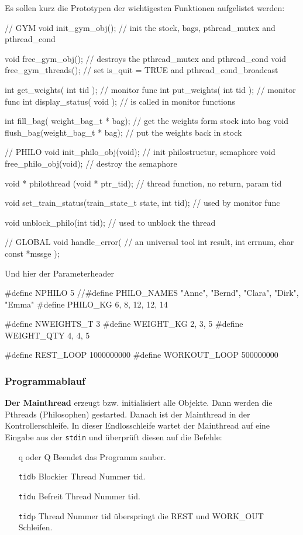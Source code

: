 \documentclass[
   draft=false
  ,paper=a4
  ,twoside=false
  ,fontsize=11pt
  ,headsepline
  ,BCOR10mm
  ,DIV11
  ,parskip=full+
]{scrartcl} %
\begin{document}
Es sollen kurz die Prototypen der wichtigesten Funktionen aufgelistet werden:
\begin{ccode}
//     GYM
void init_gym_obj();  // init the stock, bags, pthread_mutex and pthread_cond

void free_gym_obj();  // destroys the pthread_mutex and pthread_cond
void free_gym_threads(); //  set is_quit = TRUE and pthread_cond_broadcast

int get_weights( int tid );  // monitor func
int put_weights( int tid );  // monitor func
int display_status( void );  // is called in monitor functions

int fill_bag( weight_bag_t * bag);  // get the weights form stock into bag
void flush_bag(weight_bag_t * bag); // put the weights back in stock

//     PHILO
void init_philo_obj(void);  // init philostructur, semaphore
void free_philo_obj(void);  // destroy the semaphore

void * philothread (void * ptr_tid); // thread function, no return, param tid

void set_train_status(train_state_t state, int tid); // used by monitor func

void unblock_philo(int tid);  // used to unblock the thread

//     GLOBAL
void handle_error(            // an universal tool
int result, int errnum, char const *mssge
);

\end{ccode}


Und hier der Parameterheader
\begin{ccode}
  #define NPHILO      5
  //#define PHILO_NAMES { "Anne", "Bernd", "Clara", "Dirk", "Emma" }
  #define PHILO_KG    {      6,       8,      12,     12,     14 }

  #define NWEIGHTS_T 3
  #define WEIGHT_KG  { 2, 3, 5 }
  #define WEIGHT_QTY { 4, 4, 5 }

  #define REST_LOOP   1000000000
  #define WORKOUT_LOOP 500000000
\end{ccode}


\subsubsection{Programmablauf}
\textbf{Der Mainthread} erzeugt bzw. initialisiert alle Objekte. Dann werden
die Pthreads (Philosophen) gestarted. Danach ist der Mainthread in der
Kontrollerschleife. In dieser Endlosschleife wartet der
Mainthread auf eine Eingabe aus der \texttt{stdin} und überprüft diesen
auf die Befehle:
\begin{enumerate}
  \item[q oder Q] Beendet das Programm sauber.
  \item[\texttt{tid}b] Blockier Thread Nummer tid.
  \item[\texttt{tid}u] Befreit Thread Nummer tid.
  \item[\texttt{tid}p] Thread Nummer tid überspringt die REST und WORK\_OUT
   Schleifen.
\end{enumerate}
\end{document}
